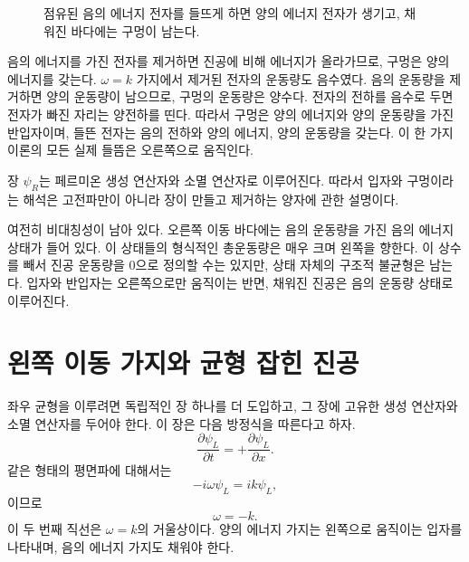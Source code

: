 \begin{figure}[htbp]
\centering
{}
\caption{점유된 음의 에너지 전자를 들뜨게 하면 양의 에너지 전자가 생기고, 채워진 바다에는 구멍이 남는다.}
\end{figure}

음의 에너지를 가진 전자를 제거하면 진공에 비해 에너지가 올라가므로, 구멍은 양의 에너지를 갖는다. \(\omega=k\) 가지에서 제거된 전자의 운동량도 음수였다. 음의 운동량을 제거하면 양의 운동량이 남으므로, 구멍의 운동량은 양수다. 전자의 전하를 음수로 두면 전자가 빠진 자리는 양전하를 띤다. 따라서 구멍은 양의 에너지와 양의 운동량을 가진 반입자이며, 들뜬 전자는 음의 전하와 양의 에너지, 양의 운동량을 갖는다. 이 한 가지 이론의 모든 실제 들뜸은 오른쪽으로 움직인다.

장 \(\psi_R\)는 페르미온 생성 연산자와 소멸 연산자로 이루어진다. 따라서 입자와 구멍이라는 해석은 고전파만이 아니라 장이 만들고 제거하는 양자에 관한 설명이다.

여전히 비대칭성이 남아 있다. 오른쪽 이동 바다에는 음의 운동량을 가진 음의 에너지 상태가 들어 있다. 이 상태들의 형식적인 총운동량은 매우 크며 왼쪽을 향한다. 이 상수를 빼서 진공 운동량을 0으로 정의할 수는 있지만, 상태 자체의 구조적 불균형은 남는다. 입자와 반입자는 오른쪽으로만 움직이는 반면, 채워진 진공은 음의 운동량 상태로 이루어진다.

\section{왼쪽 이동 가지와 균형 잡힌 진공}

좌우 균형을 이루려면 독립적인 장 하나를 더 도입하고, 그 장에 고유한 생성 연산자와 소멸 연산자를 두어야 한다. 이 장은 다음 방정식을 따른다고 하자.
\begin{equation}
\frac{\partial\psi_L}{\partial t}
=
+\frac{\partial\psi_L}{\partial x}.
\end{equation}
같은 형태의 평면파에 대해서는
\begin{equation}
-i\omega\psi_L=ik\psi_L,
\end{equation}
이므로
\begin{equation}
\omega=-k.
\end{equation}
이 두 번째 직선은 \(\omega=k\)의 거울상이다. 양의 에너지 가지는 왼쪽으로 움직이는 입자를 나타내며, 음의 에너지 가지도 채워야 한다.

